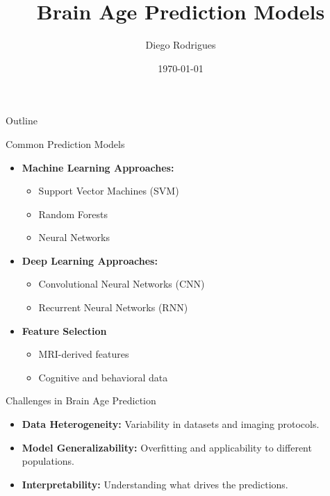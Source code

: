 \documentclass{beamer}
\title{Brain Age Prediction Models}
\date{\today}
\author{Diego Rodrigues}
\begin{document}
\maketitle

\begin{frame}{Outline}
  \tableofcontents
\end{frame}

\begin{frame}{Common Prediction Models}
  \begin{itemize}
    \item \textbf{Machine Learning Approaches:}
      \begin{itemize}
        \item Support Vector Machines (SVM)
        \item Random Forests
        \item Neural Networks
      \end{itemize}
    \item \textbf{Deep Learning Approaches:}
      \begin{itemize}
        \item Convolutional Neural Networks (CNN)
        \item Recurrent Neural Networks (RNN)
      \end{itemize}
    \item \textbf{Feature Selection}
      \begin{itemize}
        \item MRI-derived features
        \item Cognitive and behavioral data
      \end{itemize}
  \end{itemize}
\end{frame}

\begin{frame}{Challenges in Brain Age Prediction}
  \begin{itemize}
    \item \textbf{Data Heterogeneity:} Variability in datasets and imaging protocols.
    \item \textbf{Model Generalizability:} Overfitting and applicability to different populations.
    \item \textbf{Interpretability:} Understanding what drives the predictions.
  \end{itemize}
\end{frame}

\end{document}
